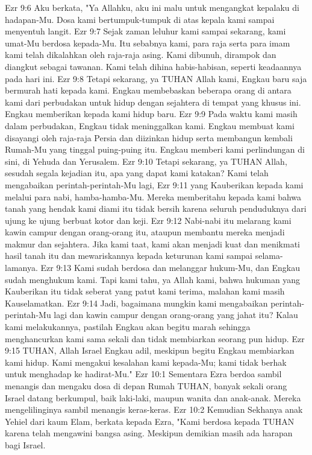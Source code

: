 Ezr 9:6  Aku berkata, "Ya Allahku, aku ini malu untuk mengangkat kepalaku di hadapan-Mu. Dosa kami bertumpuk-tumpuk di atas kepala kami sampai menyentuh langit.
Ezr 9:7  Sejak zaman leluhur kami sampai sekarang, kami umat-Mu berdosa kepada-Mu. Itu sebabnya kami, para raja serta para imam kami telah dikalahkan oleh raja-raja asing. Kami dibunuh, dirampok dan diangkut sebagai tawanan. Kami telah dihina habis-habisan, seperti keadaannya pada hari ini.
Ezr 9:8  Tetapi sekarang, ya TUHAN Allah kami, Engkau baru saja bermurah hati kepada kami. Engkau membebaskan beberapa orang di antara kami dari perbudakan untuk hidup dengan sejahtera di tempat yang khusus ini. Engkau memberikan kepada kami hidup baru.
Ezr 9:9  Pada waktu kami masih dalam perbudakan, Engkau tidak meninggalkan kami. Engkau membuat kami disayangi oleh raja-raja Persia dan diizinkan hidup serta membangun kembali Rumah-Mu yang tinggal puing-puing itu. Engkau memberi kami perlindungan di sini, di Yehuda dan Yerusalem.
Ezr 9:10  Tetapi sekarang, ya TUHAN Allah, sesudah segala kejadian itu, apa yang dapat kami katakan? Kami telah mengabaikan perintah-perintah-Mu lagi,
Ezr 9:11  yang Kauberikan kepada kami melalui para nabi, hamba-hamba-Mu. Mereka memberitahu kepada kami bahwa tanah yang hendak kami diami itu tidak bersih karena seluruh penduduknya dari ujung ke ujung berbuat kotor dan keji.
Ezr 9:12  Nabi-nabi itu melarang kami kawin campur dengan orang-orang itu, ataupun membantu mereka menjadi makmur dan sejahtera. Jika kami taat, kami akan menjadi kuat dan menikmati hasil tanah itu dan mewariskannya kepada keturunan kami sampai selama-lamanya.
Ezr 9:13  Kami sudah berdosa dan melanggar hukum-Mu, dan Engkau sudah menghukum kami. Tapi kami tahu, ya Allah kami, bahwa hukuman yang Kauberikan itu tidak seberat yang patut kami terima, malahan kami masih Kauselamatkan.
Ezr 9:14  Jadi, bagaimana mungkin kami mengabaikan perintah-perintah-Mu lagi dan kawin campur dengan orang-orang yang jahat itu? Kalau kami melakukannya, pastilah Engkau akan begitu marah sehingga menghancurkan kami sama sekali dan tidak membiarkan seorang pun hidup.
Ezr 9:15  TUHAN, Allah Israel Engkau adil, meskipun begitu Engkau membiarkan kami hidup. Kami mengakui kesalahan kami kepada-Mu; kami tidak berhak untuk menghadap ke hadirat-Mu."
Ezr 10:1  Sementara Ezra berdoa sambil menangis dan mengaku dosa di depan Rumah TUHAN, banyak sekali orang Israel datang berkumpul, baik laki-laki, maupun wanita dan anak-anak. Mereka mengelilinginya sambil menangis keras-keras.
Ezr 10:2  Kemudian Sekhanya anak Yehiel dari kaum Elam, berkata kepada Ezra, "Kami berdosa kepada TUHAN karena telah mengawini bangsa asing. Meskipun demikian masih ada harapan bagi Israel.
